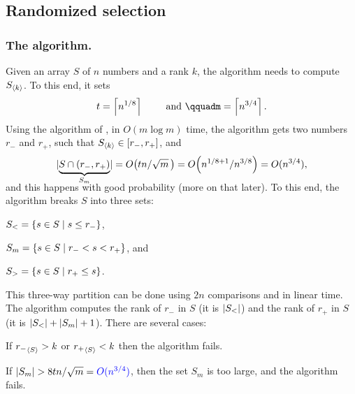 \subsection{Randomized selection}

\subsubsection{The algorithm.}
Given an array $S$ of $n$ numbers and a rank $k$, the algorithm needs to
compute $S_{\langle k\rangle}$. To this end, it sets
\begin{equation*}
    t= \ceil{n^{1/8}}
    \qquad\text{ and }\qquad%
    m = \ceil{n^{3/4}}.
\end{equation*}
Using the algorithm of , in $O( m \log m)$ time,
the algorithm gets two numbers $r_{-}$ and $r_+$, such that
$S_{\langle k\rangle} \in [r_{-}, r_{+}]$, and
\begin{equation*}
    \cardin{ \smash{\underbrace{S \cap (r_{-}, r_{+})}_{S_m}} }%
    =%
    O\bigl(tn /\sqrt{m}\,\bigr)%
    =%
    O\pth{ n^{1/8+ 1}  / n^{3/8}}%
    =%
    O(n^{3/4}),
\end{equation*} %
and this happens with good probability (more on that later).
To this end, the algorithm breaks $S$ into three sets:
\begin{compactenumi}
    \smallskip%
    \item $S_< = \left\{  s \in S \;\middle\vert\; s \leq r_{-} \right\}$,
    \smallskip%
    \item $S_m = \left\{  s \in S \;\middle\vert\; r_{-} < s < r_{+} \right\}$, and
    \smallskip%
    \item $S_> = \left\{  s \in S \;\middle\vert\;  r_{+} \leq s \right\}$.
\end{compactenumi}%
\medskip%
This three-way partition can be done using $2n$ comparisons and in linear
time.  The algorithm computes the rank of $r_-$ in $S$ (it is
$\left| {S_<} \right|$) and the rank of $r_{+}$ in $S$ (it is
$\left| {S_<} \right| + \left| {S_m} \right| + 1$). There are several cases: \smallskip%
\begin{compactitem}
    \item If ${r_{-}}_{ \left\langle { S} \right\rangle} > k$ or ${r_{+}}_{ \left\langle {S} \right\rangle} < k $ then the
    algorithm fails.

    \item If $\left| {S_m} \right| > 8 t {n}/ \sqrt{m} = {\color{blue}O(n^{3/4})}$,
    then the set $S_m$ is too large, and the algorithm fails.
\end{compactitem}
